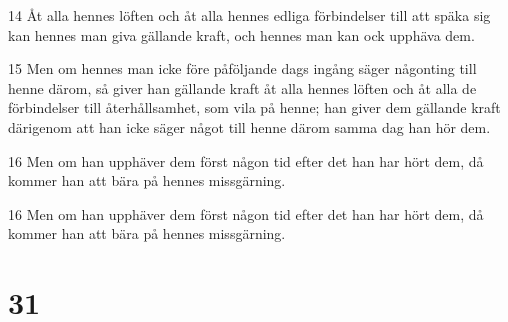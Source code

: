 \par 14 Åt alla hennes löften och åt alla hennes edliga förbindelser till att späka sig kan hennes man giva gällande kraft, och hennes man kan ock upphäva dem.
\par 15 Men om hennes man icke före påföljande dags ingång säger någonting till henne därom, så giver han gällande kraft åt alla hennes löften och åt alla de förbindelser till återhållsamhet, som vila på henne; han giver dem gällande kraft därigenom att han icke säger något till henne därom samma dag han hör dem.
\par 16 Men om han upphäver dem först någon tid efter det han har hört dem, då kommer han att bära på hennes missgärning.
\par 16 Men om han upphäver dem först någon tid efter det han har hört dem, då kommer han att bära på hennes missgärning.

\chapter{31}

